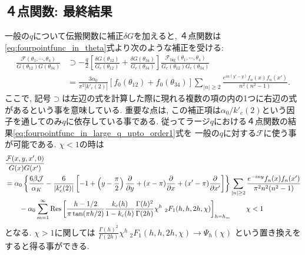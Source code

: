 \subsection{４点関数: 最終結果}
一般の$q$について伝搬関数に補正$\delta G$を加えると, 
４点関数は\eqref{eq:fourpointfunc_in_theta}式より次のような補正を受ける:
\begin{align}
	\frac{\mathcal{F}(\theta_1, \cdots, \theta_4)}{G(\theta_{12})G(\theta_{34})}
	&\supset -\frac{q}{2}
		\left[
			\frac{\delta G(\theta_{12})}{G_c(\theta_{12})}
			+ \frac{\delta G(\theta_{34})}{G_c(\theta_{34})}
		\right]
		\frac{\mathcal{F}_{\mathrm{big}}(\theta_1, \cdots, \theta_4)}
			{G_c(\theta_{12})G_c(\theta_{34})}\\
	&= \frac{3\alpha_0}{\pi^2|k'_c(2)|}[f_0(\theta_{12}) + f_0(\theta_{34})]
		\sum_{|n|\geq 2}\frac{e^{in(y'-y)}f_n(x)f_n(x')}{n^2(n^2-1)}.
\end{align}
ここで, 記号$\supset$は左辺の式を計算した際に現れる複数の項の内の1つに右辺の式があるという事を意味している.
重要な点は, この補正項は$\alpha_0 / k'_c(2)$という因子を通してのみ$q$に依存している事である. 
従ってラージ$q$における４点関数の結果\eqref{eq:fourpointfunc_in_large_q_upto_order1}式を
一般の$q$に対する$\mathcal{F}$に使う事が可能である. 
$\chi < 1$の時は
\begin{align}
	&\frac{\mathcal{F}(x,y,x',0)}{G(x)G(x')}\nonumber\\
	&= \alpha_0\left\{
		\frac{6\beta\mathcal{J}}{\alpha_K} - \frac{6}{|k'_c(2)|}
		\left[
			-1 + \left(y-\frac{\pi}{2}\right)\frac{\partial}{\partial y}
			+ (x - \pi)\frac{\partial}{\partial x} + (x' - \pi)\frac{\partial}{\partial x'}
		\right]
	\right\}\sum_{|n|\geq 2}\frac{e^{-iny}f_n(x)f_n(x')}{\pi^2n^2(n^2-1)}\nonumber\\
	&\hspace{20pt}
	-\alpha_0\sum_{m=1}^{\infty}\mathrm{Res}\left[
		\frac{h-1/2}{\pi\tan(\pi h/2)}\frac{k_c(h)}{1-k_c(h)}\frac{\Gamma(h)^2}{\Gamma(2h)}
		\chi^h\ {}_2F_1(h, h, 2h, \chi)
	\right]_{h=h_m}
	\hspace{20pt}\chi < 1
\end{align}
となる. 
$\chi > 1$に関しては
$\frac{\Gamma(h)^2}{\Gamma(2h)}\chi^h\ {}_2F_1(h, h, 2h, \chi)\to \Psi_h(\chi)$
という置き換えをすると得る事ができる. 

\pagebreak
